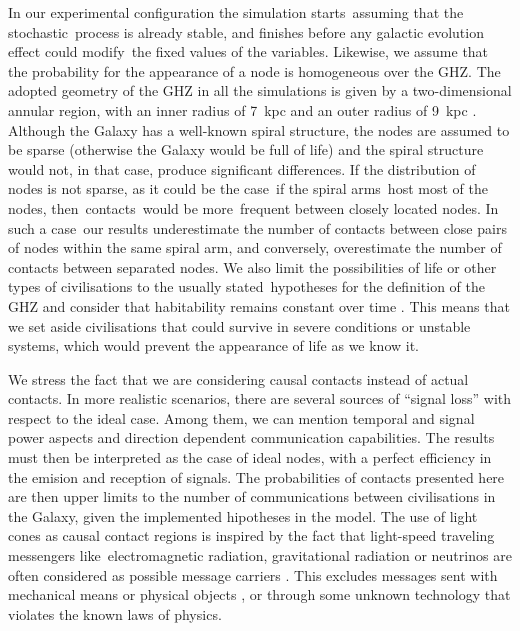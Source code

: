 \documentclass[crop]{CSLB}
\newcommand{\ceti}{node}
\newcommand{\cetis}{nodes}
\begin{document}
In our experimental configuration the simulation starts assuming that
the stochastic process is already stable, and finishes before any
galactic evolution effect could modify the fixed values of the
variables.
%
Likewise, we assume that the probability for the appearance of a
\ceti{} is homogeneous over the GHZ.
%
The adopted geometry of the GHZ in all the simulations is given by a
two-dimensional annular region, with an inner radius of 7~kpc and an
outer radius of 9~kpc \citep{lineweaver_galactic_2004}.
%
Although the Galaxy has a well-known spiral structure, the nodes are
assumed to be sparse (otherwise the Galaxy would be full of life) and
the spiral structure would not, in that case, produce significant
differences.
%
If the distribution of nodes is not sparse, as it could be the case if
the spiral arms host most of the \cetis{}, then contacts would be
more frequent between closely located nodes.
%
In such a case our results underestimate the number of contacts
between close pairs of nodes within the same spiral arm, and
conversely, overestimate the number of contacts between separated
nodes.
%
We also limit the possibilities of life or other types of
civilisations to the usually stated hypotheses for the definition of
the GHZ \citep{dayal_habitability_2016, gonzalez_galactic_2001,
lineweaver_galactic_2004, gonzalez_habitable_2005,
morrison_extending_2015, haqq-misra_evolution_2019,
rahvar_cosmic_2016, gobat_evolution_2016, rahvar_cosmic_2016} and
consider that habitability remains constant over time \citep[see,
however, ][]{gonzalez_habitable_2005, dayal_habitability_2016,
gobat_evolution_2016}.
%
This means that we set aside civilisations that could survive in
severe conditions or unstable systems, which would prevent the
appearance of life as we know it.  



We stress the fact that we are considering causal contacts instead of
actual contacts.
%
In more realistic scenarios, there are several sources of ``signal
loss'' with respect to the ideal case.
%
Among them, we can mention temporal and signal power aspects and
direction dependent communication capabilities.
%
The results must then be interpreted as the case of ideal nodes, with
a perfect efficiency in the emision and reception of signals.
%
The probabilities of contacts presented here are then upper limits to
the number of communications between civilisations in the Galaxy,
given the implemented hipotheses in the model.
%
The use of light cones as causal contact regions is inspired by the
fact that light-speed traveling messengers like electromagnetic
radiation, gravitational radiation or neutrinos are often considered
as possible message carriers \citep{hippke_interstellar_2017,
wright_how_2018}.
%
This excludes messages sent with mechanical means or physical objects
\citep[e.g., ][]{Armstrong2013, barlow_galactic_2013}, or through some
unknown technology that violates the known laws of physics.
\end{document}
